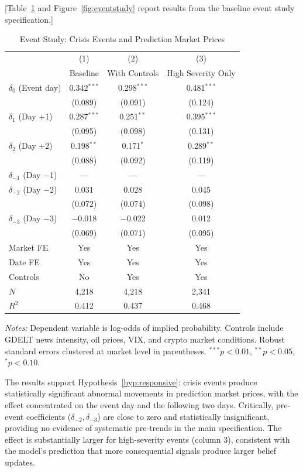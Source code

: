 \documentclass[12pt]{article}
\begin{document}
[Table~\ref{tab:eventstudy} and Figure~\ref{fig:eventstudy} report results from the baseline event study specification.]

\begin{table}[htbp]
\centering
\caption{Event Study: Crisis Events and Prediction Market Prices}
\label{tab:eventstudy}
\begin{tabular}{lccc}
\hline\hline
& (1) & (2) & (3) \\
& Baseline & With Controls & High Severity Only \\
\hline
$\delta_0$ (Event day) & 0.342$^{***}$ & 0.298$^{***}$ & 0.481$^{***}$ \\
& (0.089) & (0.091) & (0.124) \\
$\delta_1$ (Day +1) & 0.287$^{***}$ & 0.251$^{**}$ & 0.395$^{***}$ \\
& (0.095) & (0.098) & (0.131) \\
$\delta_2$ (Day +2) & 0.198$^{**}$ & 0.171$^{*}$ & 0.289$^{**}$ \\
& (0.088) & (0.092) & (0.119) \\
$\delta_{-1}$ (Day $-$1) & --- & --- & --- \\
$\delta_{-2}$ (Day $-$2) & 0.031 & 0.028 & 0.045 \\
& (0.072) & (0.074) & (0.098) \\
$\delta_{-3}$ (Day $-$3) & $-$0.018 & $-$0.022 & 0.012 \\
& (0.069) & (0.071) & (0.095) \\
\hline
Market FE & Yes & Yes & Yes \\
Date FE & Yes & Yes & Yes \\
Controls & No & Yes & Yes \\
$N$ & 4,218 & 4,218 & 2,341 \\
$R^2$ & 0.412 & 0.437 & 0.468 \\
\hline\hline
\end{tabular}
\begin{minipage}{0.9\textwidth}
\vspace{0.3em}
\footnotesize \textit{Notes:} Dependent variable is log-odds of implied probability. Controls include GDELT news intensity, oil prices, VIX, and crypto market conditions. Robust standard errors clustered at market level in parentheses. $^{***}p<0.01$, $^{**}p<0.05$, $^{*}p<0.10$.
\end{minipage}
\end{table}

The results support Hypothesis~\ref{hyp:responsive}: crisis events produce statistically significant abnormal movements in prediction market prices, with the effect concentrated on the event day and the following two days. Critically, pre-event coefficients ($\delta_{-2}, \delta_{-3}$) are close to zero and statistically insignificant, providing no evidence of systematic pre-trends in the main specification. The effect is substantially larger for high-severity events (column 3), consistent with the model's prediction that more consequential signals produce larger belief updates.
\end{document}
